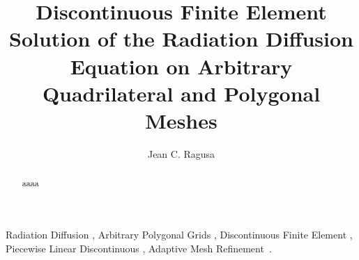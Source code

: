 \documentclass[preprint,10pt]{elsarticle}
\begin{document}
 

\begin{frontmatter}



\title{Discontinuous Finite Element Solution of the Radiation Diffusion Equation on Arbitrary Quadrilateral and Polygonal Meshes}


\author{Jean C. Ragusa}
\address{Department of Nuclear Engineering, Texas A\&M University, College Station, TX 77843, USA}


\begin{abstract}

aaaa

\end{abstract}

\begin{keyword}
  Radiation Diffusion \sep
	Arbitrary Polygonal Grids \sep
  Discontinuous Finite Element \sep
  Piecewise Linear Discontinuous \sep
  Adaptive Mesh Refinement\, .
\end{keyword}

\end{frontmatter}
\end{document}
